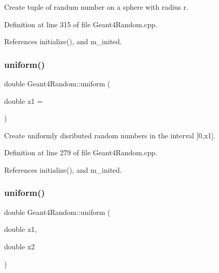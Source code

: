 Create tuple of randum number on a sphere with radius r. 



Definition at line 315 of file Geant4\+Random.\+cpp.



References initialize(), and m\+\_\+inited.

\hypertarget{class_d_d4hep_1_1_simulation_1_1_geant4_random_af0c23cab921aa21e6707eae5091aba15}{}\label{class_d_d4hep_1_1_simulation_1_1_geant4_random_af0c23cab921aa21e6707eae5091aba15} 
\subsubsection{\texorpdfstring{uniform()}{uniform()}\hspace{0.1cm}{\footnotesize\ttfamily [1/2]}}
{\footnotesize\ttfamily double Geant4\+Random\+::uniform (\begin{DoxyParamCaption}\item[{double}]{x1 = {} }\end{DoxyParamCaption})}



Create uniformly disributed random numbers in the interval \mbox{]}0,x1\mbox{]}. 



Definition at line 279 of file Geant4\+Random.\+cpp.



References initialize(), and m\+\_\+inited.

\hypertarget{class_d_d4hep_1_1_simulation_1_1_geant4_random_a5e717c2a88ed9c72dcfb8e2de1c4bef3}{}\label{class_d_d4hep_1_1_simulation_1_1_geant4_random_a5e717c2a88ed9c72dcfb8e2de1c4bef3} 
\subsubsection{\texorpdfstring{uniform()}{uniform()}\hspace{0.1cm}{\footnotesize\ttfamily [2/2]}}
{\footnotesize\ttfamily double Geant4\+Random\+::uniform (\begin{DoxyParamCaption}\item[{double}]{x1,  }\item[{double}]{x2 }\end{DoxyParamCaption})}



